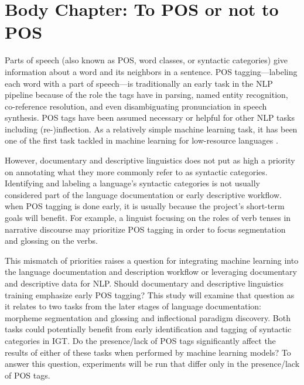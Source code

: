 \section{Body Chapter: To POS or not to POS}
\label{sec:POS}

Parts of speech (also known as POS, word classes, or syntactic categories) give information about a word and its neighbors in a sentence. POS tagging---labeling each word with a part of speech---is traditionally an early task in the NLP pipeline because of the role the tags have in parsing, named entity recognition, co-reference resolution, and even disambiguating pronunciation in speech synthesis. POS tags have been assumed necessary or helpful for other NLP tasks including (re-)inflection. As a relatively simple machine learning task, it has been one of the first task tackled in machine learning for low-resource languages \citep{cox_probabilistic_2010,de_pauw_resource-light_2012,baldridge_learning_2013,duong_natural_2017,anastasopoulos_computational_2019,millour_unsupervised_2019}. 

However, documentary and descriptive linguistics does not put as high a priority on annotating what they more commonly refer to as syntactic categories. Identifying and labeling a  language's syntactic categories is not usually considered part of the language documentation or early descriptive workflow. when POS tagging is done early, it is usually because the project's short-term goals will benefit. For example, a linguist focusing on the roles of verb tenses in narrative discourse may prioritize POS tagging in order to focus segmentation and glossing on the verbs. 

This mismatch of priorities raises a question for integrating machine learning into the language documentation and description workflow or leveraging documentary and descriptive data for NLP. Should documentary and descriptive linguistics training emphasize early POS tagging? 
This study will examine that question as it relates to two tasks from the later stages of language documentation: morpheme segmentation and glossing and inflectional paradigm discovery. Both tasks could potentially benefit from early identification and tagging of syntactic categories in IGT. Do the presence/lack of POS tags significantly affect the results of either of these tasks when performed by machine learning models? To answer this question, experiments will be run that differ only in the presence/lack of POS tags.

